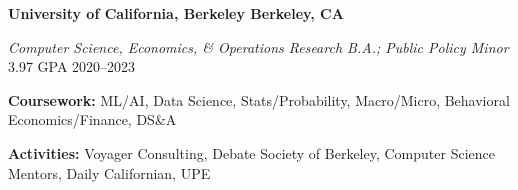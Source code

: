 \textbf{University of California, Berkeley \hfill Berkeley, CA} \par
\textit{Computer Science, Economics, \& Operations Research B.A.; Public Policy Minor} 3.97 GPA \hfill 2020--2023\par
\textbf{Coursework:} ML/AI, Data Science, Stats/Probability, Macro/Micro, Behavioral Economics/Finance, DS\&A\par
\textbf{Activities:} Voyager Consulting, Debate Society of Berkeley, Computer Science Mentors, Daily Californian, UPE